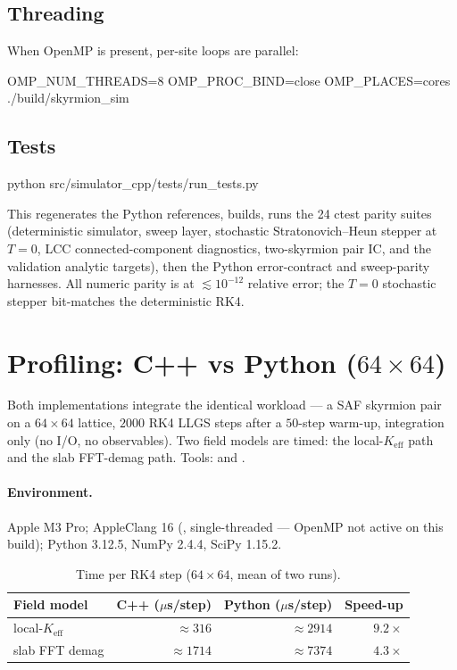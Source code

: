 \documentclass[11pt,a4paper]{article}
\begin{document}
\subsection{Threading}
When OpenMP is present, per-site loops are parallel:
\begin{shell}
OMP_NUM_THREADS=8 OMP_PROC_BIND=close OMP_PLACES=cores ./build/skyrmion_sim
\end{shell}

\subsection{Tests}
\begin{shell}
python src/simulator_cpp/tests/run_tests.py
\end{shell}
This regenerates the Python references, builds, runs the 24 ctest
parity suites (deterministic simulator, sweep layer, stochastic
Stratonovich--Heun stepper at $T=0$, LCC connected-component
diagnostics, two-skyrmion pair IC, and the validation analytic targets),
then the Python error-contract and sweep-parity harnesses. All numeric
parity is at $\lesssim 10^{-12}$ relative error; the $T=0$ stochastic
stepper bit-matches the deterministic RK4.

\section{Profiling: C++ vs Python ($64\times64$)}

Both implementations integrate the identical workload --- a SAF
skyrmion pair on a $64\times64$ lattice, $2000$ RK4 LLGS steps after a
$50$-step warm-up, integration only (no I/O, no observables). Two
field models are timed: the local-$K_{\text{eff}}$ path and the slab
FFT-demag path. Tools:  and
.

\paragraph{Environment.} Apple M3 Pro; AppleClang 16
(, single-threaded --- OpenMP not active on
this build); Python 3.12.5, NumPy 2.4.4, SciPy 1.15.2.

\begin{table}[h]
\centering
\caption{Time per RK4 step ($64\times64$, mean of two runs).}
\label{tab:profile}
\begin{tabular}{l r r r}
\toprule
Field model & C++ ($\mu$s/step) & Python ($\mu$s/step) & Speed-up \\
\midrule
local-$K_{\text{eff}}$ & $\approx 316$ & $\approx 2914$ & $9.2\times$ \\
slab FFT demag         & $\approx 1714$ & $\approx 7374$ & $4.3\times$ \\
\bottomrule
\end{tabular}
\end{table}
\end{document}
